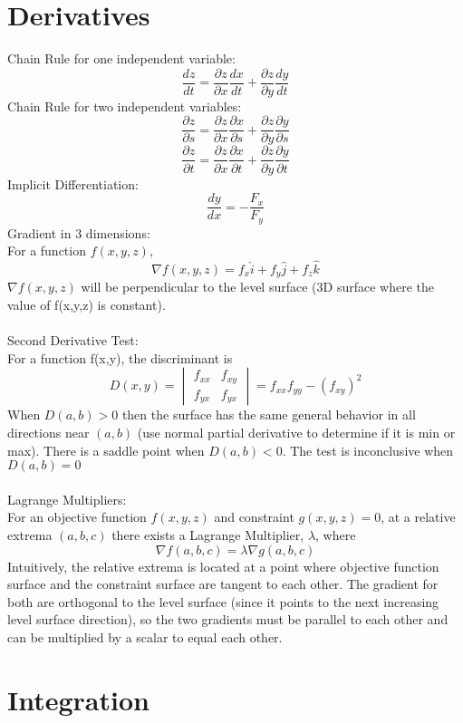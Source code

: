 \documentclass{article}
\begin{document}
\section{Derivatives}
Chain Rule for one independent variable:
$$\frac{dz}{dt} = \frac{\partial z}{\partial x} \frac{dx}{dt} + \frac{\partial z}{\partial y} \frac{dy}{dt}$$
Chain Rule for two independent variables:
$$\frac{\partial z}{\partial s} = \frac{\partial z}{\partial x} \frac{\partial x}{\partial s} + \frac{\partial z}{\partial y}\frac{\partial y}{\partial s}$$
$$\frac{\partial z}{\partial t} = \frac{\partial z}{\partial x} \frac{\partial x}{\partial t} + \frac{\partial z}{\partial y}\frac{\partial y}{\partial t}$$
Implicit Differentiation: 
$$\frac{dy}{dx} = -\frac{F_x}{F_y}$$
Gradient in 3 dimensions:
\\For a function $f(x,y,z)$,
$$\nabla f(x,y,z) = f_x \hat{i} + f_y \hat{j} + f_z \hat{k}$$
$\nabla f(x,y,z)$ will be perpendicular to the level surface (3D surface where the value of f(x,y,z) is constant).
\\
\\Second Derivative Test:
\\For a function f(x,y), the discriminant is
$$D(x,y) = \begin{vmatrix} 
    f_{xx} & f_{xy} \\ f_{yx} & f_{yx}
    \end{vmatrix} = f_{xx} f_{yy} - (f_{xy} )^2$$
When $D(a,b) > 0$ then the surface has the same general behavior in all directions near $(a,b)$ (use normal partial derivative to determine if it is min or max). There is a saddle point when $D(a,b) < 0$. The test is inconclusive when $D(a,b) = 0$ 
\\
\\
Lagrange Multipliers:
\\For an objective function $f(x,y,z)$ and constraint $g(x,y,z) = 0$, at a relative extrema $(a,b,c)$ there exists a Lagrange Multiplier, $\lambda$, where
$$\nabla f(a,b,c) = \lambda \nabla g(a,b,c)$$
Intuitively, the  relative extrema is located at a point where objective function surface and the constraint surface are tangent to each other. The gradient for both are orthogonal to the level surface (since it points to the next increasing level surface direction), so the two gradients must be parallel to each other and can be multiplied by a scalar to equal each other.   

\section{Integration}
\end{document}
